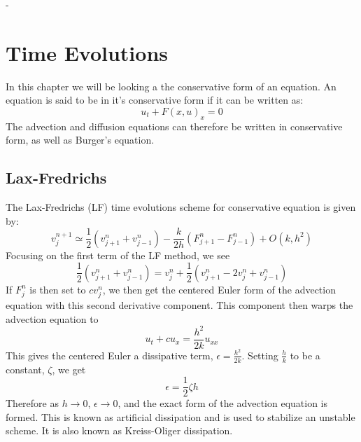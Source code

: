 -\chapter{Time Evolutions}
In this chapter we will be looking a the conservative form of an equation. An equation is said to be in it's conservative form if it can be written as:
\begin{equation*}
  u_t + F(x,u)_x = 0
\end{equation*}
The advection and diffusion equations can therefore be written in conservative form, as well as Burger's equation.
\section{Lax-Fredrichs}
The Lax-Fredrichs (LF) time evolutions scheme for conservative equation is given by:
\begin{equation*}
  v^{n+1}_j \simeq \frac{1}{2}(v^n_{j+1} + v^n_{j-1}) - \frac{k}{2h}(F^n_{j+1}-F^n_{j-1}) + O(k,h^2)
\end{equation*}
Focusing on the first term of the LF method, we see 
\begin{equation*}
  \frac{1}{2}(v^n_{j+1} + v^n_{j-1}) = v^n_j + \frac{1}{2}(v^n_{j+1} - 2v^n_j + v^n_{j-1})
\end{equation*}
If $F^n_j$ is then set to $cv^n_j$, we then get the centered Euler form of the advection equation with this second derivative component. This component then warps the advection equation to 
\begin{equation*}
 u_t + cu_x = \frac{h^2}{2k}u_{xx}
\end{equation*}
This gives the centered Euler a dissipative term, $\epsilon = \frac{h^2}{2k}$. Setting $\frac{h}{k}$ to be a constant, $\zeta$, we get
\begin{equation*}
  \epsilon = \frac{1}{2}\zeta h
\end{equation*}
Therefore as $h\rightarrow 0$, $\epsilon\rightarrow0$, and the exact form of the advection equation is formed. This is known as artificial dissipation and is used to stabilize an unstable scheme. It is also known as Kreiss-Oliger dissipation.

